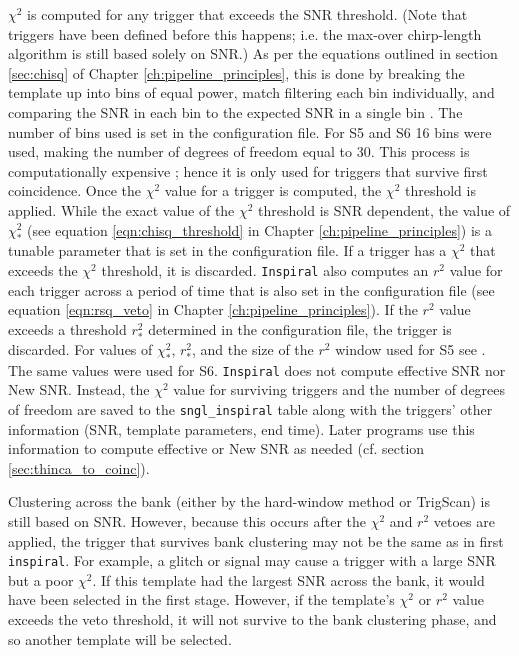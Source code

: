 $\chi^2$ is computed for any trigger that exceeds the \ac{SNR} threshold. (Note
that triggers have been defined before this happens; i.e. the max-over
chirp-length algorithm is still based solely on \ac{SNR}.) As per the equations
outlined in section \ref{sec:chisq} of Chapter \ref{ch:pipeline_principles},
this is done by breaking the template up into bins of equal power, match
filtering each bin individually, and comparing the \ac{SNR} in each bin to the
expected \ac{SNR} in a single bin \cite{Allen:2004, Allen:2005fk}. The number
of bins used is set in the configuration file. For \ac{S5} and \ac{S6} 16 bins
were used, making the number of degrees of freedom equal to 30. This process is
computationally expensive \cite{Allen:2005fk}; hence it is only used for
triggers that survive first coincidence. Once the $\chi^2$ value for a trigger
is computed, the $\chi^2$ threshold is applied. While the exact value of the
$\chi^2$ threshold is \ac{SNR} dependent, the value of $\chi_*^2$ (see equation
\ref{eqn:chisq_threshold} in Chapter \ref{ch:pipeline_principles}) is a
tunable parameter \cite{Keppel:thesis} that is set in the configuration file.
If a trigger has a $\chi^2$ that exceeds the $\chi^2$ threshold, it is
discarded. \texttt{Inspiral} also computes an $r^2$ value for each trigger
across a period of time that is also set in the configuration file (see
equation \ref{eqn:rsq_veto} in Chapter \ref{ch:pipeline_principles}). If the
$r^2$ value exceeds a threshold $r_*^2$ determined in the configuration file,
the trigger is discarded. For values of $\chi_*^2$, $r_*^2$, and the size of
the $r^2$ window used for \ac{S5} see \cite{Rodriguez:2007, Keppel:thesis}. The
same values were used for \ac{S6}. \texttt{Inspiral} does not compute effective
\ac{SNR} nor New \ac{SNR}. Instead, the $\chi^2$ value for surviving triggers
and the number of degrees of freedom are saved to the \texttt{sngl\_inspiral}
table along with the triggers' other information (\ac{SNR}, template
parameters, end time). Later programs use this information to compute effective
or New \ac{SNR} as needed (cf. section \ref{sec:thinca_to_coinc}).

Clustering across the bank (either by the hard-window method or TrigScan) is
still based on \ac{SNR}. However, because this occurs after the $\chi^2$ and
$r^2$ vetoes are applied, the trigger that survives bank clustering may not be
the same as in first \texttt{inspiral}. For example, a glitch or signal may
cause a trigger with a large \ac{SNR} but a poor $\chi^2$. If this template had
the largest \ac{SNR} across the bank, it would have been selected in the first
stage. However, if the template's $\chi^2$ or $r^2$ value exceeds the veto
threshold, it will not survive to the bank clustering phase, and so another
template will be selected. 

